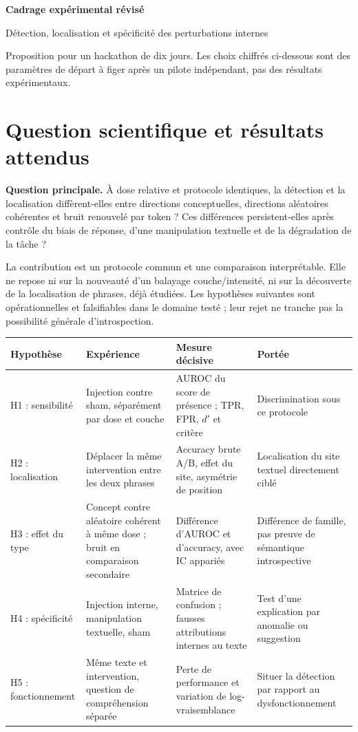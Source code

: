 \documentclass[10pt,a4paper]{article}
\begin{document}
\begin{center}
{\LARGE\bfseries Cadrage expérimental révisé\par}
{\large Détection, localisation et spécificité des perturbations internes\par}
\vspace{5pt}
{\small Proposition pour un hackathon de dix jours. Les choix chiffrés ci-dessous sont des paramètres de départ à figer après un pilote indépendant, pas des résultats expérimentaux.\par}
\end{center}

\section{Question scientifique et résultats attendus}
\textbf{Question principale.} À dose relative et protocole identiques, la détection et la localisation diffèrent-elles entre directions conceptuelles, directions aléatoires cohérentes et bruit renouvelé par token ? Ces différences persistent-elles après contrôle du biais de réponse, d'une manipulation textuelle et de la dégradation de la tâche ?

La contribution est un protocole commun et une comparaison interprétable. Elle ne repose ni sur la nouveauté d'un balayage couche/intensité, ni sur la découverte de la localisation de phrases, déjà étudiées. Les hypothèses suivantes sont opérationnelles et falsifiables dans le domaine testé ; leur rejet ne tranche pas la possibilité générale d'introspection.

\small
\begin{longtable}{@{}L{2.0cm}L{5.2cm}L{5.0cm}L{3.9cm}@{}}
\toprule\textbf{Hypothèse} & \textbf{Expérience} & \textbf{Mesure décisive} & \textbf{Portée}\\\midrule
H1 : sensibilité & Injection contre sham, séparément par dose et couche & AUROC du score de présence ; TPR, FPR, $d'$ et critère & Discrimination sous ce protocole\\\midrule
H2 : localisation & Déplacer la même intervention entre les deux phrases & Accuracy brute A/B, effet du site, asymétrie de position & Localisation du site textuel directement ciblé\\\midrule
H3 : effet du type & Concept contre aléatoire cohérent à même dose ; bruit en comparaison secondaire & Différence d'AUROC et d'accuracy, avec IC appariés & Différence de famille, pas preuve de sémantique introspective\\\midrule
H4 : spécificité & Injection interne, manipulation textuelle, sham & Matrice de confusion ; fausses attributions internes au texte & Test d'une explication par anomalie ou suggestion\\\midrule
H5 : fonctionnement & Même texte et intervention, question de compréhension séparée & Perte de performance et variation de log-vraisemblance & Situer la détection par rapport au dysfonctionnement\\\bottomrule
\end{longtable}
\normalsize
\end{document}
